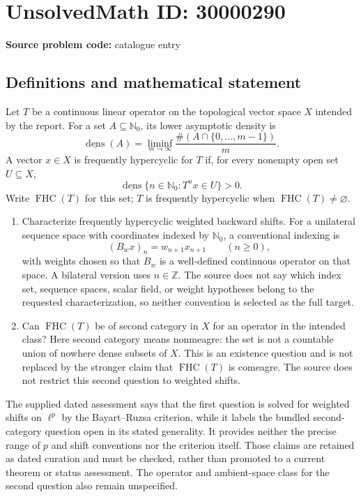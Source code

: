 \documentclass[11pt]{article}
\newcommand{\N}{\mathbb{N}}
\newcommand{\Z}{\mathbb{Z}}
\begin{document}
\section*{UnsolvedMath ID: 30000290}
\textbf{Source problem code:} catalogue entry
\subsection{Definitions and mathematical statement}
Let $T$ be a continuous linear operator on the topological vector space $X$ intended by the report. For a set $A\subseteq\N_0$, its lower asymptotic density is
\[
 \underline{\operatorname{dens}}(A)
 =\liminf_{m\to\infty}\frac{\#(A\cap\{0,\ldots,m-1\})}{m}.
\]
A vector $x\in X$ is frequently hypercyclic for $T$ if, for every nonempty open set $U\subseteq X$,
\[
 \underline{\operatorname{dens}}\{n\in\N_0:T^nx\in U\}>0.
\]
Write $\operatorname{FHC}(T)$ for this set; $T$ is frequently hypercyclic when $\operatorname{FHC}(T)\ne\varnothing$.

\begin{enumerate}
\item Characterize frequently hypercyclic weighted backward shifts. For a unilateral sequence space with coordinates indexed by $\N_0$, a conventional indexing is
\[
 (B_wx)_n=w_{n+1}x_{n+1}\qquad(n\ge0),
\]
with weights chosen so that $B_w$ is a well-defined continuous operator on that space. A bilateral version uses $n\in\Z$. The source does not say which index set, sequence spaces, scalar field, or weight hypotheses belong to the requested characterization, so neither convention is selected as the full target.
\item Can $\operatorname{FHC}(T)$ be of second category in $X$ for an operator in the intended class? Here second category means nonmeagre: the set is not a countable union of nowhere dense subsets of $X$. This is an existence question and is not replaced by the stronger claim that $\operatorname{FHC}(T)$ is comeagre. The source does not restrict this second question to weighted shifts.
\end{enumerate}

The supplied dated assessment says that the first question is solved for weighted shifts on $\ell^p$ by the Bayart--Ruzsa criterion, while it labels the bundled second-category question open in its stated generality. It provides neither the precise range of $p$ and shift conventions nor the criterion itself. Those claims are retained as dated curation and must be checked, rather than promoted to a current theorem or status assessment. The operator and ambient-space class for the second question also remain unspecified.
\end{document}
